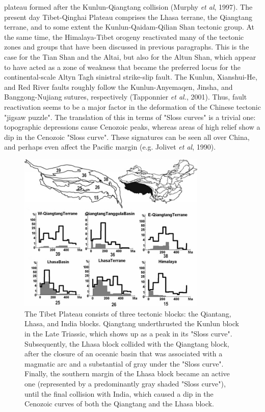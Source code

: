 \documentclass{article}
\begin{document}
 plateau formed  after the Kunlun-Qiangtang collision  (Murphy {\it et
 al}, 1997). The present day Tibet-Qinghai Plateau comprises the Lhasa
 terrane,   the   Qiangtang   terrane,   and  to   some   extent   the
 Kunlun-Qaidam-Qilian  Shan tectonic  group.   At the  same time,  the
 Himalaya-Tibet  orogeny reactivated  many of  the tectonic  zones and
 groups that have  been discussed in previous paragraphs.  This is the
 case for  the Tian Shan and the  Altai, but also for  the Altun Shan,
 which appear  to have  acted as  a zone of  weakness that  became the
 preferred  locus  for  the  continental-scale  Altyn  Tagh  sinistral
 strike-slip  fault.  The  Kunlun, Xianshui-He,  and Red  River faults
 roughly  follow the  Kunlun-Anyemaqen,  Jinsha, and  Banggong-Nujiang
 sutures, respectively  (Tapponnier {\it  et al.}, 2001).   Thus, fault
 reactivation seems  to be  a major factor  in the deformation  of the
 Chinese tectonic  "jigsaw puzzle".  The translation of  this in terms
 of  "Sloss curves" is  a trivial  one: topographic  depressions cause
 Cenozoic  peaks, whereas  areas  of high  relief  show a  dip in  the
 Cenozoic "Sloss curve". These signatures  can be seen all over China,
 and perhaps  even affect  the Pacific margin  (e.g.  Jolivet  {\it et
 al}, 1990).

 \begin{figure}[here]
 \begin{center}
 \includegraphics[width=0.8\textwidth]{southwestbisb.jpg}
 \caption{ 
 The Tibet  Plateau consists of  three tectonic blocks:  the Qiantang,
 Lhasa, and India blocks.  Qiangtang underthrusted the Kunlun block in
 the Late  Triassic, which shows  up as a  peak in its  "Sloss curve".
 Subsequently,  the Lhasa  block  collided with  the Qiangtang  block,
 after  the closure of  an oceanic  basin that  was associated  with a
 magmatic   arc  and   a  substantial   of  gray   under   the  "Sloss
 curve". Finally,  the southern  margin of the  Lhasa block  became an
 active  one  (represented  by  a  predominantly  gray  shaded  "Sloss
 curve"), until the final collision  with India, which caused a dip in
 the  Cenozoic curves  of  both  the Qiangtang  and  the Lhasa  block.
 }\label{fig:southwest}
 \end{center}
 \end{figure}
\end{document}

